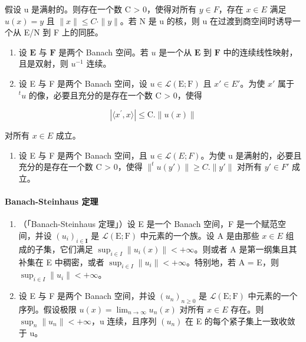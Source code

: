 假设 u 是满射的。则存在一个数 C \textgreater{} 0，使得对所有 \(y \in F\)，存在 \(x \in E\) 满足 \(u(x) = y\) 且 \(\|x\| \leqslant C \cdot \|y\|\)。若 N 是 u 的核，则 u 在过渡到商空间时诱导一个从 E/N 到 F 上的同胚。

\begin{enumerate}
\def\labelenumi{\arabic{enumi})}
\setcounter{enumi}{12}
\item
  设 \(\mathbf{E}\) 与 \(\mathbf{F}\) 是两个 Banach 空间。若 \(u\) 是一个从 \(\mathbf{E}\) 到 \(\mathbf{F}\) 中的连续线性映射，且是双射，则 \(u^{-1}\) 连续。
\item
  设 E 与 F 是两个 Banach 空间，设 \(u \in \mathcal{L}(\mathrm{E}; \mathrm{F})\) 且 \(x' \in E'\)。为使 \(x'\) 属于 \(^{t}u\) 的像，必要且充分的是存在一个数 C \textgreater{} 0，使得
\end{enumerate}

\[
\left| \langle x ^ {\prime}, x \rangle \right| \leqslant \mathrm{C.} \| u (x) \|\tag{7}
\]

对所有 \(x \in E\) 成立。

\begin{enumerate}
\def\labelenumi{(\arabic{enumi})}
\setcounter{enumi}{14}
\tightlist
\item
   设 E 与 F 是两个 Banach 空间，且 \(u \in \mathcal{L}(E; F)\)。为使 u 是满射的，必要且充分的是存在一个数 C \textgreater{} 0，使得 \(\|^{t}u(y')\| \geqslant C. \|y'\|\) 对所有 \(y' \in F'\) 成立。
\end{enumerate}

\paragraph{Banach-Steinhaus 定理}

\begin{enumerate}
\def\labelenumi{\arabic{enumi})}
\setcounter{enumi}{15}
\item
  （「Banach-Steinhaus 定理」）设 E 是一个 Banach 空间，F 是一个赋范空间，并设 \((u_{i})_{i\in\mathbf{I}}\) 是 \(\mathcal{L}(\mathrm{E};\mathrm{F})\) 中元素的一个族。设 A 是由那些 \(x\in E\) 组成的子集，它们满足 \(\sup_{i\in I}\|u_{i}(x)\|<+\infty\)。则或者 A 是第一纲集且其补集在 E 中稠密，或者 \(\sup_{i\in I}\|u_{i}\|<+\infty\)。特别地，若 A = E，则 \(\sup_{i\in I}\|u_{i}\|<+\infty\)。
\item
  设 E 与 F 是两个 Banach 空间，并设 \((u_{n})_{n\geq0}\) 是 \(\mathcal{L}(\mathrm{E};\mathrm{F})\) 中元素的一个序列。假设极限 \(u(x)=\lim_{n\to\infty}u_{n}(x)\) 对所有 \(x\in E\) 存在。则 \(\sup_{n}\|u_{n}\|<+\infty\)，u 连续，且序列 \((u_{n})\) 在 E 的每个紧子集上一致收敛于 u。
\end{enumerate}

